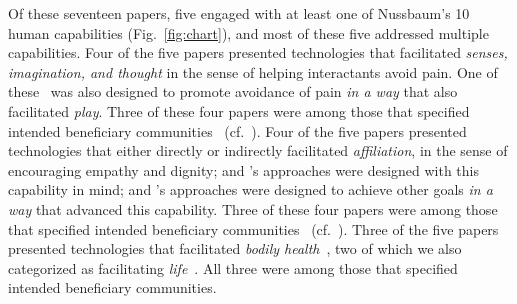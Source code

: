 \documentclass[letterpaper]{article} %
\begin{document}
Of these seventeen papers, five engaged with at least one of Nussbaum's 10 human capabilities (Fig.~\ref{fig:chart}), and most of these five addressed multiple capabilities.
Four of the five papers presented technologies that facilitated \textit{senses, imagination, and thought} in the sense of helping interactants avoid pain. One of these~\cite{foster2020towards} was also designed to promote avoidance of pain \textit{in a way} that also facilitated \textit{play}. Three of these four papers were among those that specified intended beneficiary communities~\cite{reneau2020supporting,foster2020towards,pourebadi2020stroke} (cf.~\citet{jeong2020face}).
Four of the five papers presented technologies that either directly or indirectly facilitated \textit{affiliation}, in the sense of encouraging empathy and dignity; \citet{pourebadi2020stroke} and \citet{jeong2020face}'s approaches were designed with this capability in mind; \citet{reneau2020supporting} and \citet{wilson2020knowledge}'s approaches were designed to achieve other goals \textit{in a way} that advanced this capability. Three of these four papers were among those that specified intended beneficiary communities~\cite{reneau2020supporting,wilson2020knowledge,pourebadi2020stroke} (cf.~\citet{jeong2020face}).
Three of the five papers presented technologies that facilitated \textit{bodily health}~\cite{reneau2020supporting,wilson2020knowledge,pourebadi2020stroke}, two of which we also categorized as facilitating \textit{life}~\cite{wilson2020knowledge,pourebadi2020stroke}. All three were among those that specified intended beneficiary communities.
\end{document}
